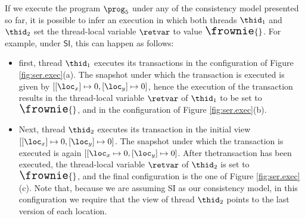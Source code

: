 

If we execute the program $\prog_5$ under any of the consistency model presented so far, it is possible to infer 
an execution in which both threads $\thid_1$ and $\thid_2$ set the 
thread-local variable $\retvar$ to value ${\Large \frownie{}}$.
For example, under $\mathsf{SI}$, this can happen as follows: 
\begin{itemize}
\item first, thread $\thid_1$ executes its transactions in the 
configuration of Figure \ref{fig:ser.exec}(a). The snapshot 
under which the transaction is executed is given by $[[\loc_x] \mapsto 0, [\loc_y] \mapsto 0]$, 
hence the execution of the transaction results in the thread-local variable $\retvar$ of $\thid_1$ 
to be set to ${\Large \frownie{}}$, and in the configuration of Figure \ref{fig:ser.exec}(b).
\item Next, thread $\thid_2$ executes its transaction in the initial 
view $[ [\loc_x] \mapsto 0, [\loc_y] \mapsto 0]$. The snapshot under which 
the transaction is executed is again $[[\loc_x \mapsto 0, [\loc_y] \mapsto 0]$. After 
thetransaction has been executed, the thread-local variable $\retvar$ of $\thid_2$ is 
set to ${\Large \frownie{}}$, and the final configuration is the one of Figure \ref{fig:ser.exec}(c). 
Note that, because we are assuming SI as our consistency model, in this configuration 
we require that the view of thread $\thid_2$ points to the last version of each location.
\end{itemize}


